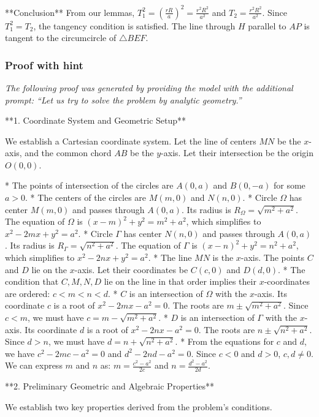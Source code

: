 **Conclusion**
From our lemmas, $T_1^2 = (\frac{rR}{a})^2 = \frac{r^2R^2}{a^2}$ and $T_2 = \frac{r^2R^2}{a^2}$.
Since $T_1^2 = T_2$, the tangency condition is satisfied. The line through $H$ parallel to $AP$ is tangent to the circumcircle of $\triangle BEF$.

\subsubsection{Proof with hint}

\textit{The following proof was generated by providing the model with the additional prompt: ``Let us try to solve the problem by analytic geometry.''}

**1. Coordinate System and Geometric Setup**

We establish a Cartesian coordinate system. Let the line of centers $MN$ be the $x$-axis, and the common chord $AB$ be the $y$-axis. Let their intersection be the origin $O(0,0)$.

*   The points of intersection of the circles are $A(0,a)$ and $B(0,-a)$ for some $a>0$.
*   The centers of the circles are $M(m,0)$ and $N(n,0)$.
*   Circle $\Omega$ has center $M(m,0)$ and passes through $A(0,a)$. Its radius is $R_\Omega = \sqrt{m^2+a^2}$. The equation of $\Omega$ is $(x-m)^2+y^2 = m^2+a^2$, which simplifies to $x^2-2mx+y^2=a^2$.
*   Circle $\Gamma$ has center $N(n,0)$ and passes through $A(0,a)$. Its radius is $R_\Gamma = \sqrt{n^2+a^2}$. The equation of $\Gamma$ is $(x-n)^2+y^2 = n^2+a^2$, which simplifies to $x^2-2nx+y^2=a^2$.
*   The line $MN$ is the $x$-axis. The points $C$ and $D$ lie on the $x$-axis. Let their coordinates be $C(c,0)$ and $D(d,0)$.
*   The condition that $C, M, N, D$ lie on the line in that order implies their $x$-coordinates are ordered: $c < m < n < d$.
*   $C$ is an intersection of $\Omega$ with the $x$-axis. Its coordinate $c$ is a root of $x^2-2mx-a^2=0$. The roots are $m \pm \sqrt{m^2+a^2}$. Since $c<m$, we must have $c = m-\sqrt{m^2+a^2}$.
*   $D$ is an intersection of $\Gamma$ with the $x$-axis. Its coordinate $d$ is a root of $x^2-2nx-a^2=0$. The roots are $n \pm \sqrt{n^2+a^2}$. Since $d>n$, we must have $d=n+\sqrt{n^2+a^2}$.
*   From the equations for $c$ and $d$, we have $c^2-2mc-a^2=0$ and $d^2-2nd-a^2=0$. Since $c<0$ and $d>0$, $c,d \neq 0$. We can express $m$ and $n$ as:
    $m = \frac{c^2-a^2}{2c}$ and $n = \frac{d^2-a^2}{2d}$.

**2. Preliminary Geometric and Algebraic Properties**

We establish two key properties derived from the problem's conditions.

